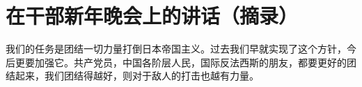 \section[在干部新年晚会上的讲话（摘录）（一九四五年一月一日）]{在干部新年晚会上的讲话（摘录）}


我们的任务是团结一切力量打倒日本帝国主义。过去我们早就实现了这个方针，今后更要加强它。共产党员，中国各阶层人民，国际反法西斯的朋友，都要更好的团结起来，我们团结得越好，则对于敌人的打击也越有力量。


